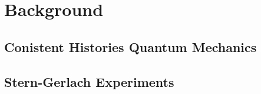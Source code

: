 \part{Background}
\chapter{Conistent Histories Quantum Mechanics}
\chapter{Stern-Gerlach Experiments}
